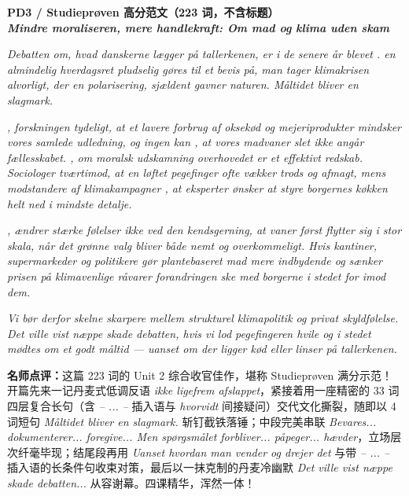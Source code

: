 \begin{answerbox}
\textbf{PD3 / Studieprøven 高分范文（223 词，不含标题）}\\
\textit{\textbf{Mindre moraliseren, mere handlekraft: Om mad og klima uden skam}}

\textit{Debatten om, hvad danskerne lægger på tallerkenen, er i de senere år blevet .  en almindelig hverdagsret  pludselig gøres til et bevis på,  man tager klimakrisen alvorligt,  der en polarisering,  sjældent gavner naturen. Måltidet bliver en slagmark.}

\textit{, forskningen  tydeligt, at et lavere forbrug af oksekød og mejeriprodukter mindsker vores samlede udledning, og ingen kan , at vores madvaner slet ikke angår fællesskabet. , om moralsk udskamning overhovedet er et effektivt redskab. Sociologer  tværtimod, at en løftet pegefinger ofte vækker trods og afmagt, mens modstandere af klimakampagner , at eksperter ønsker at styre borgernes køkken helt ned i mindste detalje.}

\textit{, ændrer stærke følelser ikke ved den kendsgerning, at vaner først flytter sig i stor skala, når det grønne valg bliver både nemt og overkommeligt. Hvis kantiner, supermarkeder og politikere gør plantebaseret mad mere indbydende og sænker prisen på klimavenlige råvarer   forandringen ske med borgerne i stedet for imod dem.}

\textit{Vi bør derfor skelne skarpere mellem strukturel klimapolitik og privat skyldfølelse. Det ville vist næppe skade debatten, hvis vi lod pegefingeren hvile og i stedet mødtes om et godt måltid --- uanset om der ligger kød eller linser på tallerkenen.}

\small\textbf{名师点评：}这篇 223 词的 Unit 2 综合收官佳作，堪称 Studieprøven 满分示范！开篇先来一记丹麦式低调反语 \textit{ikke ligefrem afslappet}，紧接着用一座精密的 33 词四层复合长句（含 \textit{-- ... --} 插入语与 \textit{hvorvidt} 间接疑问）交代文化撕裂，随即以 4 词短句 \textit{Måltidet bliver en slagmark.} 斩钉截铁落锤；中段完美串联 \textit{Bevares... dokumenterer... foregive... Men spørgsmålet forbliver... påpeger... hævder}，立场层次纤毫毕现；结尾段再用 \textit{Uanset hvordan man vender og drejer det} 与带 \textit{-- ... --} 插入语的长条件句收束对策，最后以一抹克制的丹麦冷幽默 \textit{Det ville vist næppe skade debatten...} 从容谢幕。四课精华，浑然一体！
\end{answerbox}
